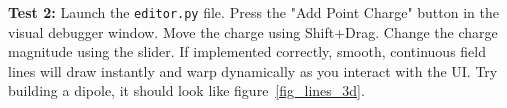 \documentclass[11pt]{article}
\begin{document}
\par\noindent\textbf{Test 2:} Launch the \lstinline|editor.py| file. Press the "Add Point Charge" button in the visual debugger window. Move the charge using Shift+Drag. Change the charge magnitude using the slider. If implemented correctly, smooth, continuous field lines will draw instantly and warp dynamically as you interact with the UI. Try building a dipole, it should look like figure~\ref{fig_lines_3d}.
\end{document}

